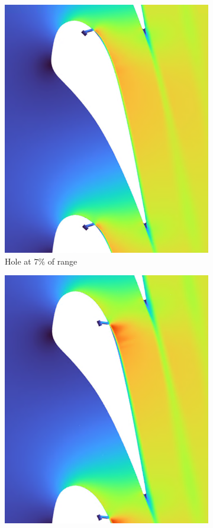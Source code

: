 \documentclass[a4paper, 11pt, oneside]{report}
\begin{document}
\begin{figure}[H]
\begin{subfigure}{.42\textwidth}
		\includegraphics[width=\linewidth]{figs/sch_mach_contours_1.png}
		\caption{Hole at $7\%$ of range}
		\vspace{0.018\textheight}
	\end{subfigure}
	\begin{subfigure}{.42\textwidth}
		\centering
		\includegraphics[width=\linewidth]{figs/sch_mach_contours_2.png}

\end{subfigure}
\end{figure}
\end{document}
